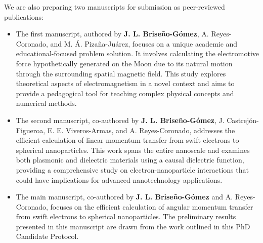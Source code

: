 We are also preparing two manuscripts for submission as peer-reviewed publications:
%
\begin{itemize}
	\item The first manuscript, authored by \textbf{J. L. Briseño-Gómez}, A. Reyes-Coronado, and M. Á. Pizaña-Juárez, focuses on a unique academic and educational-focused problem solution. It involves calculating the electromotive force hypothetically generated on the Moon due to its natural motion through the surrounding spatial magnetic field. This study explores theoretical aspects of electromagnetism in a novel context and aims to provide a pedagogical tool for teaching complex physical concepts and numerical methods.
	\item The second manuscript, co-authored by \textbf{J. L. Briseño-Gómez}, J. Castrejón-Figueroa, E. E. Viveros-Armas, and A. Reyes-Coronado, addresses the efficient calculation of linear momentum transfer from swift electrons to spherical nanoparticles. This work spans the entire nanoscale and examines both plasmonic and dielectric materials using a causal dielectric function, providing a comprehensive study on electron-nanoparticle interactions that could have implications for advanced nanotechnology applications.	
	\item The main manuscript, co-authored by \textbf{J. L. Briseño-Gómez} and A. Reyes-Coronado, focuses on the efficient calculation of angular momentum transfer from swift electrons to spherical nanoparticles. The preliminary results presented in this manuscript are drawn from the work outlined in this PhD Candidate Protocol. 
\end{itemize}


